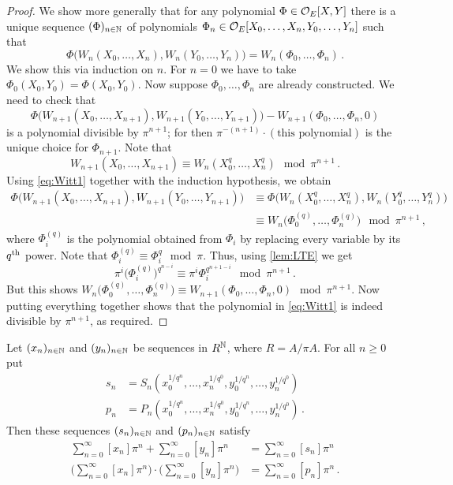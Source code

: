 \documentclass[a4paper, 10pt, oneside, DIV=9, chapterprefix=true, numbers=enddot,bibliography=totoc]{scrbook}
\begin{document}
\begin{proof}%
	We show more generally that for any polynomial $\Phi\in\mathcal{O}_E[X,Y]$ there is a unique sequence $(\Phi)_{n\in\mathbb{N}}$ of polynomials $\Phi_n\in\mathcal{O}_E[X_0,\dotsc,X_n,Y_0,\dotsc,Y_n]$ such that
	\begin{equation*}
		\Phi\big(W_n(X_0,\dotsc,X_n),W_n(Y_0,\dotsc,Y_n)\big)=W_n(\Phi_0,\dotsc,\Phi_n)\,.
	\end{equation*}
	We show this via induction on $n$. For $n=0$ we have to take $\Phi_0(X_0,Y_0)=\Phi(X_0,Y_0)$. Now suppose $\Phi_0,\dotsc,\Phi_n$ are already constructed. We need to check that
	\begin{equation}\label{eq:Witt1}
		\Phi\big(W_{n+1}(X_0,\dotsc,X_{n+1}),W_{n+1}(Y_0,\dotsc,Y_{n+1})\big)-W_{n+1}(\Phi_0,\dotsc,\Phi_n,0)
	\end{equation}
	is a polynomial divisible by $\pi^{n+1}$; for then $\pi^{-(n+1)}\cdot(\text{this polynomial})$ is the unique choice for $\Phi_{n+1}$. Note that 
	\begin{equation}\label{eq:Witt2}
		W_{n+1}(X_0,\dotsc,X_{n+1})\equiv W_n\left(X_0^q,\dotsc,X_n^q\right)\mod\pi^{n+1}\,.
	\end{equation}
	Using \cref{eq:Witt1} together with the induction hypothesis, we obtain
	\begin{align*}
		\Phi\big(W_{n+1}(X_0,\dotsc,X_{n+1}),W_{n+1}(Y_0,\dotsc,Y_{n+1})\big)&\equiv \Phi\big(W_n(X_0^q,\dotsc,X_n^q),W_n(Y_0^q,\dotsc,Y_n^q)\big)\\
		&\equiv W_n\big(\Phi_0^{(q)},\dotsc,\Phi_n^{(q)}\big)\mod \pi^{n+1}\,,
	\end{align*}
	where $\Phi_i^{(q)}$ is the polynomial obtained from $\Phi_i$ by replacing every variable by its $q^{\text{th}}$ power. Note that $\Phi_i^{(q)}\equiv \Phi_i^q\mod \pi$. Thus, using \cref{lem:LTE} we get
	\begin{equation*}
		\pi^i\big(\Phi_i^{(q)}\big)^{q^{n-i}}\equiv \pi^i\Phi_i^{q^{n+1-i}}\mod \pi^{n+1}\,.
	\end{equation*}
	But this shows $W_n\big(\Phi_0^{(q)},\dotsc,\Phi_n^{(q)}\big)\equiv W_{n+1}(\Phi_0,\dotsc,\Phi_n,0)\mod \pi^{n+1}$. Now putting everything together shows that the polynomial in \cref{eq:Witt1} is indeed divisible by $\pi^{n+1}$, as required.
\end{proof}
\begin{cor}\label{cor:snpn}
	Let $(x_n)_{n\in\mathbb{N}}$ and $(y_n)_{n\in\mathbb{N}}$ be sequences in $R^{\mathbb{N}}$, where $R=A/\pi A$. For all $n\geq 0$ put
	\begin{align*}
		s_n&=S_n\left(x_0^{1/q^n},\dotsc,x_n^{1/q^0},y_0^{1/q^n},\dotsc,y_n^{1/q^0}\right)\\
		p_n&=P_n\left(x_0^{1/q^n},\dotsc,x_n^{1/q^0},y_0^{1/q^n},\dotsc,y_n^{1/q^0}\right)\,. 
	\end{align*}
	Then these sequences $(s_n)_{n\in\mathbb{N}}$ and $(p_n)_{n\in\mathbb{N}}$ satisfy
	\begin{align*}
		\sum_{n=0}^\infty[x_n]\pi^n+\sum_{n=0}^\infty[y_n]\pi^n&=\sum_{n=0}^\infty[s_n]\pi^n\\
		\Bigg(\sum_{n=0}^\infty[x_n]\pi^n\Bigg)\cdot\Bigg(\sum_{n=0}^\infty[y_n]\pi^n\Bigg)&=\sum_{n=0}^\infty[p_n]\pi^n\,.
	\end{align*}
\end{cor}
\end{document}
